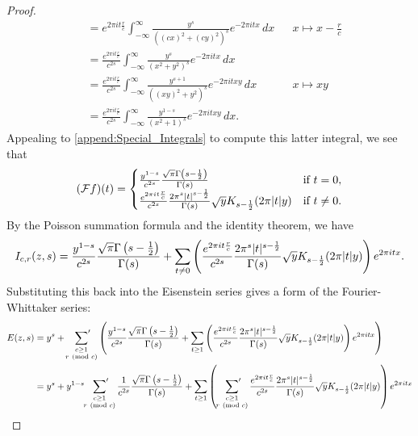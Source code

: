 \begin{proof}
\begin{align*}
          &= e^{2\pi it\frac{r}{c}}\int_{-\infty}^{\infty}\frac{y^{s}}{((cx)^{2}+(cy)^{2})^{s}}e^{-2\pi itx}\,dx && \text{$x \mapsto x-\frac{r}{c}$} \\
          &= \frac{e^{2\pi it\frac{r}{c}}}{c^{2s}}\int_{-\infty}^{\infty}\frac{y^{s}}{(x^{2}+y^{2})^{s}}e^{-2\pi itx}\,dx \\
          &= \frac{e^{2\pi it\frac{r}{c}}}{c^{2s}}\int_{-\infty}^{\infty}\frac{y^{s+1}}{((xy)^{2}+y^{2})^{s}}e^{-2\pi itxy}\,dx && \text{$x \mapsto xy$} \\
          &= \frac{e^{2\pi it\frac{r}{c}}}{c^{2s}}\int_{-\infty}^{\infty}\frac{y^{1-s}}{(x^{2}+1)^{s}}e^{-2\pi itxy}\,dx.
        \end{align*}
        Appealing to \cref{append:Special_Integrals} to compute this latter integral, we see that
        \[
          (\mathcal{F}f)(t) = \begin{cases} \frac{y^{1-s}}{c^{2s}}\frac{\sqrt{\pi}\Gamma\left(s-\frac{1}{2}\right)}{\Gamma(s)} & \text{if $t = 0$}, \\ \frac{e^{2\pi it\frac{r}{c}}}{c^{2s}}\frac{2\pi^{s}|t|^{s-\frac{1}{2}}}{\Gamma(s)}\sqrt{y}K_{s-\frac{1}{2}}(2\pi|t|y) & \text{if $t \neq 0$}. \end{cases}
        \]
        By the Poisson summation formula and the identity theorem, we have
        \[
          I_{c,r}(z,s) = \frac{y^{1-s}}{c^{2s}}\frac{\sqrt{\pi}\Gamma\left(s-\frac{1}{2}\right)}{\Gamma(s)}+\sum_{t \neq 0}\left(\frac{e^{2\pi it\frac{r}{c}}}{c^{2s}}\frac{2\pi^{s}|t|^{s-\frac{1}{2}}}{\Gamma(s)}\sqrt{y}K_{s-\frac{1}{2}}(2\pi|t|y)\right)e^{2\pi itx}.
        \]
        Substituting this back into the Eisenstein series gives a form of the Fourier-Whittaker series:
      \begin{align*}
        E(z,s) &= y^{s}+\psum_{\substack{c \ge 1 \\ r \tmod{c}}}\left(\frac{y^{1-s}}{c^{2s}}\frac{\sqrt{\pi}\G\left(s-\frac{1}{2}\right)}{\G(s)}+\sum_{t \ge 1}\left(\frac{e^{2\pi it\frac{r}{c}}}{c^{2s}}\frac{2\pi^{s}|t|^{s-\frac{1}{2}}}{\G(s)}\sqrt{y}K_{s-\frac{1}{2}}(2\pi|t|y)\right)e^{2\pi itx}\right) \\
        &= y^{s}+y^{1-s}\psum_{\substack{c \ge 1 \\ r \tmod{c}}}\frac{1}{c^{2s}}\frac{\sqrt{\pi}\G\left(s-\frac{1}{2}\right)}{\G(s)}+\sum_{t \ge 1}\left(\psum_{\substack{c \ge 1 \\ r \tmod{c}}}\frac{e^{2\pi it\frac{r}{c}}}{c^{2s}}\frac{2\pi^{s}|t|^{s-\frac{1}{2}}}{\G(s)}\sqrt{y}K_{s-\frac{1}{2}}(2\pi|t|y)\right)e^{2\pi itx} \\

\end{align*}
\end{proof}
